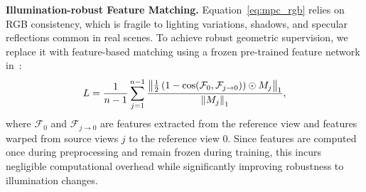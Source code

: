 \noindent\textbf{Illumination-robust Feature Matching.}
Equation~\ref{eq:mpc_rgb} relies on RGB consistency, which is fragile to 
lighting variations, shadows, and specular reflections common in real scenes. 
To achieve robust geometric supervision, we replace it with feature-based matching using a frozen pre-trained feature network in~\cite{gu2020cascade}:
\begin{equation}
\label{eq:mpc_feat}
\vspace{-0.2cm}
L = \frac{1}{n-1} \sum_{j=1}^{n-1}  \frac  {\left\| \frac{1}{2}\left(1 - \cos(\mathcal{F}_{\text{0}}, \mathcal{F}_{j \rightarrow 0 } ) \right) \odot M_j  \right\|_1} {\left\|  M_j \right\|_1},
\end{equation}
where $\mathcal{F}_{\text{0}}$ and ${ \mathcal{F}_{j \rightarrow 0 } }$ are features extracted from the reference view and features warped from source views $j$ to the reference view $0$. 
Since features are computed once during preprocessing and remain frozen during training, this incurs negligible computational overhead while significantly improving robustness to illumination changes.


